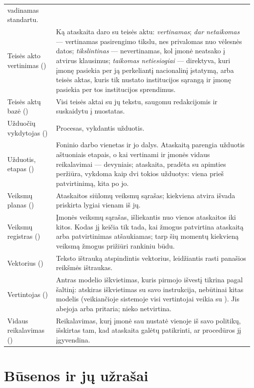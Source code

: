 \begin{xltabular}{\textwidth}{@{}L{36mm}Y@{}}
  vadinamas standartu. \\
Teisės akto vertinimas () & Ką ataskaita daro su teisės aktu:
  \emph{vertinamas}; \emph{dar netaikomas} --- vertinamas pasirengimo tikslu, nes privalomas
  nuo vėlesnės datos; \emph{tikslintinas} --- nevertinamas, kol įmonė neatsako į atvirus
  klausimus; \emph{taikomas netiesiogiai} --- direktyva, kuri įmonę pasiekia per ją
  perkeliantį nacionalinį įstatymą, arba teisės aktas, kuris tik nustato institucijos
  sąrangą ir įmonę pasiekia per tos institucijos sprendimus. \\
Teisės aktų bazė () & Visi teisės aktai su jų tekstu, saugomu
  redakcijomis ir suskaidytu į nuostatas. \\
Užduočių vykdytojas () & Procesas, vykdantis užduotis. \\
Užduotis, etapas () & Foninio darbo vienetas ir jo dalys. Ataskaitą parengia
  užduotis  aštuoniais etapais, o kai vertinami ir įmonės vidaus
  reikalavimai --- devyniais; ataskaita, pradėta su apimties peržiūra, vykdoma kaip dvi tokios
  užduotys: viena prieš patvirtinimą, kita po jo. \\
Veiksmų planas () & Ataskaitos siūlomų veiksmų sąrašas; kiekviena atvira išvada
  priskirta lygiai vienam iš jų. \\
Veiksmų registras () & Įmonės veiksmų sąrašas, išliekantis nuo vienos
  ataskaitos iki kitos. Kodas jį keičia tik tada, kai žmogus patvirtina ataskaitą arba patvirtinimas
  atšaukiamas; tarp šių momentų kiekvieną veiksmą žmogus prižiūri rankiniu būdu. \\
Vektorius () & Teksto ištrauką atspindintis vektorius, leidžiantis rasti panašios
  reikšmės ištraukas. \\
Vertintojas () & Antras modelio iškvietimas, kuris pirmojo išvestį tikrina pagal
  šaltinį: atskiras iškvietimas su savo instrukcija, nebūtinai kitas modelis (veikiančioje
  sistemoje visi vertintojai veikia su ). Jis abejoja arba pritaria; nieko
  netvirtina. \\
Vidaus reikalavimas () & Reikalavimas, kurį įmonė sau nustatė vienoje iš savo
  politikų, išskirtas tam, kad ataskaita galėtų patikrinti, ar procedūros jį įgyvendina. \\
\end{xltabular}

\section{Būsenos ir jų užrašai}\label{sec:glossary:labels}

